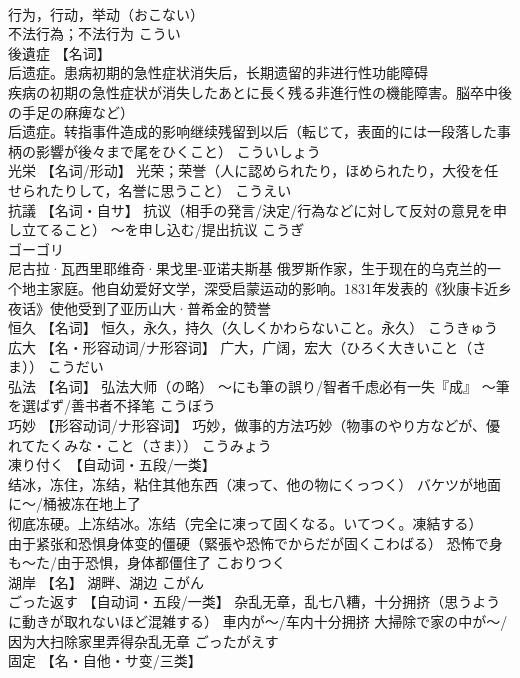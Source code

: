 \documentclass[8pt]{extreport}
\begin{document}
\begin{CJK}{UTF8}{min}
\\	行为，行动，举动（おこない） 
\\	不法行為；不法行为	こうい	
\\	後遺症	【名词】 
\\	后遗症。患病初期的急性症状消失后，长期遗留的非进行性功能障碍
\\	疾病の初期の急性症状が消失したあとに長く残る非進行性の機能障害。脳卒中後の手足の麻痺など） 
\\	后遗症。转指事件造成的影响继续残留到以后（転じて，表面的には一段落した事柄の影響が後々まで尾をひくこと）	こういしょう	
\\	光栄	【名词/形动】 光荣；荣誉（人に認められたり，ほめられたり，大役を任せられたりして，名誉に思うこと）	こうえい	
\\	抗議	【名词・自サ】 抗议（相手の発言/決定/行為などに対して反対の意見を申し立てること） ～を申し込む/提出抗议	こうぎ	
\\	ゴーゴリ	
\\	尼古拉·瓦西里耶维奇·果戈里-亚诺夫斯基 俄罗斯作家，生于现在的乌克兰的一个地主家庭。他自幼爱好文学，深受启蒙运动的影响。1831年发表的《狄康卡近乡夜话》使他受到了亚历山大·普希金的赞誉		
\\	恒久	【名词】 恒久，永久，持久（久しくかわらないこと。永久）	こうきゅう	
\\	広大	【名・形容动词/ナ形容词】 广大，广阔，宏大（ひろく大きいこと（さま））	こうだい	
\\	弘法	【名词】 弘法大师（の略） ～にも筆の誤り/智者千虑必有一失『成』 ～筆を選ばず/善书者不择笔	こうぼう	
\\	巧妙	【形容动词/ナ形容词】 巧妙，做事的方法巧妙（物事のやり方などが、優れてたくみな・こと（さま））	こうみょう	
\\	凍り付く	【自动词・五段/一类】 
\\	结冰，冻住，冻结，粘住其他东西（凍って、他の物にくっつく） バケツが地面に～/桶被冻在地上了 
\\	彻底冻硬。上冻结冰。冻结（完全に凍って固くなる。いてつく。凍結する） 
\\	由于紧张和恐惧身体变的僵硬（緊張や恐怖でからだが固くこわばる） 恐怖で身も～た/由于恐惧，身体都僵住了	こおりつく	
\\	湖岸	【名】 湖畔、湖边	こがん	
\\	ごった返す	【自动词・五段/一类】 杂乱无章，乱七八糟，十分拥挤（思うように動きが取れないほど混雑する） 車内が～/车内十分拥挤 大掃除で家の中が～/因为大扫除家里弄得杂乱无章	ごったがえす	
\\	固定	【名・自他・サ变/三类】 

\end{CJK}
\end{document}
